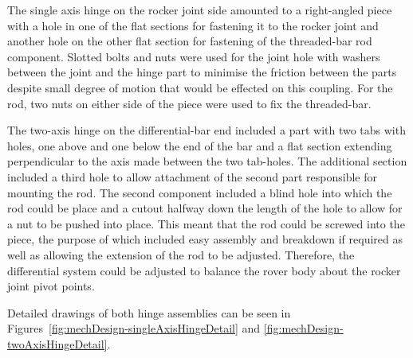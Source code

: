         The single axis hinge on the rocker joint side amounted to a right-angled piece with a hole in one of the flat sections for fastening it to the rocker joint and another hole on the other flat section for fastening of the threaded-bar rod component. Slotted bolts and nuts were used for the joint hole with washers between the joint and the hinge part to minimise the friction between the parts despite small degree of motion that would be effected on this coupling. For the rod, two nuts on either side of the piece were used to fix the threaded-bar.
        
        The two-axis hinge on the differential-bar end included a part with two tabs with holes, one above and one below the end of the bar and a flat section extending perpendicular to the axis made between the two tab-holes. The additional section included a third hole to allow attachment of the second part responsible for mounting the rod. The second component included a blind hole into which the rod could be place and a cutout halfway down the length of the hole to allow for a nut to be pushed into place. This meant that the rod could be screwed into the piece, the purpose of which included easy assembly and breakdown if required as well as allowing the extension of the rod to be adjusted. Therefore, the differential system could be adjusted to balance the rover body about the rocker joint pivot points.
        
        Detailed drawings of both hinge assemblies can be seen in Figures~\ref{fig:mechDesign-singleAxisHingeDetail} and \ref{fig:mechDesign-twoAxisHingeDetail}.
        
